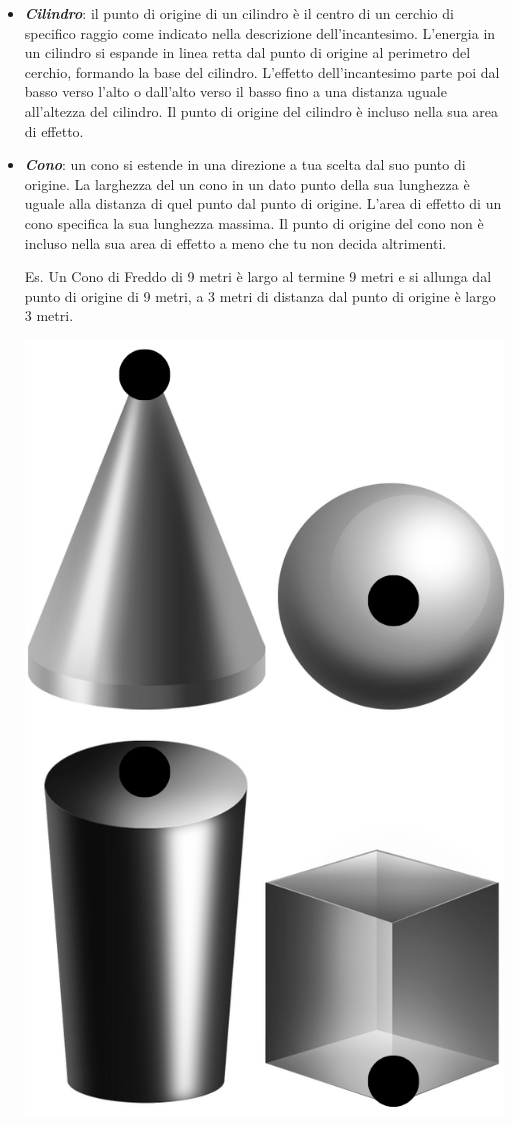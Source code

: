 \begin{multicols}{2}
\begin{itemize}[leftmargin=*] \setlength{\itemsep}{0pt}
\item \emph{\textbf{Cilindro}}: il punto di origine di un cilindro è il centro di un cerchio di specifico raggio come indicato nella descrizione dell'incantesimo. L'energia in un cilindro si espande in linea retta dal punto di origine al perimetro del cerchio, formando la base del cilindro. L'effetto dell'incantesimo parte poi dal basso verso l'alto o dall'alto verso il basso fino a una distanza uguale all'altezza del cilindro. Il punto di origine del cilindro è incluso nella sua area di effetto.

\item \emph{\textbf{Cono}}: un cono si estende in una direzione a tua scelta dal suo punto di origine. La larghezza del un cono in un dato punto della sua lunghezza è uguale alla distanza di quel punto dal punto di origine. L'area di effetto di un cono specifica la sua lunghezza massima. Il punto di origine del cono non è incluso nella sua area di effetto a meno che tu non decida altrimenti. 

Es. Un Cono di Freddo di 9 metri è largo al termine 9 metri e si allunga dal punto di origine di 9 metri, a 3 metri di distanza dal punto di origine è largo 3 metri.


\begin{center}
	\includegraphics[width=0.7\linewidth]{immagini/3dformev2.png}
	

\end{center}
\end{itemize}
\end{multicols}
